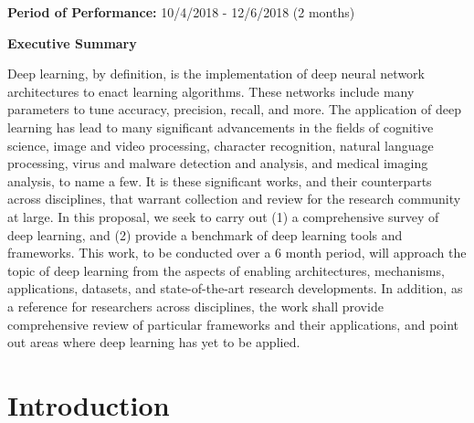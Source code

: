 \documentclass[12pt]{article}
\begin{document}
\begin{flushleft}

	\item{\bfseries Period of Performance:} 10/4/2018 - 12/6/2018 (2 months)\\[48pt]

	\begin{center}
		\Large{\bfseries Executive Summary }\\[11pt]
	\end{center}

\end{flushleft}

Deep learning, by definition, is the implementation of deep neural network architectures to enact learning algorithms. These networks include many parameters to tune accuracy, precision, recall, and more. The application of deep learning has lead to many significant advancements in the fields of cognitive science, image and video processing, character recognition, natural language processing, virus and malware detection and analysis, and medical imaging analysis, to name a few. It is these significant works, and their counterparts across disciplines, that warrant collection and review for the research community at large. In this proposal, we seek to carry out (1) a comprehensive survey of deep learning, and (2) provide a benchmark of deep learning tools and frameworks. This work, to be conducted over a 6 month period, will approach the topic of deep learning from the aspects of enabling architectures, mechanisms, applications, datasets, and state-of-the-art research developments. In addition, as a reference for researchers across disciplines, the work shall provide comprehensive review of particular frameworks and their applications, and point out areas where deep learning has yet to be applied. \\[2pt]


\newpage\tableofcontents


\newpage
{}
\clearpage
\setcounter{page}{1}

\section{Introduction}
\end{document}

